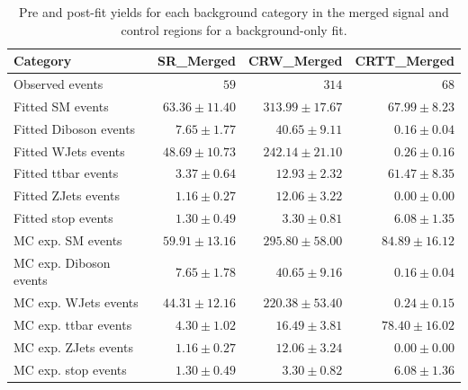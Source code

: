 \begin{table}[h]
\centering
\small
\begin{tabular*}{\textwidth}{@{\extracolsep{\fill}}lrrr}
\toprule
\textbf{Category}           & SR\_Merged            & CRW\_Merged            & CRTT\_Merged              \\
\midrule
Observed events          & $59$              & $314$              & $68$                    \\
\midrule
Fitted SM events         & $63.36 \pm 11.40$          & $313.99 \pm 17.67$          & $67.99 \pm 8.23$              \\
\midrule
        Fitted Diboson events         & $7.65 \pm 1.77$          & $40.65 \pm 9.11$          & $0.16 \pm 0.04$              \\
        Fitted WJets events         & $48.69 \pm 10.73$          & $242.14 \pm 21.10$          & $0.26 \pm 0.16$              \\
        Fitted ttbar events         & $3.37 \pm 0.64$          & $12.93 \pm 2.32$          & $61.47 \pm 8.35$              \\
        Fitted ZJets events         & $1.16 \pm 0.27$          & $12.06 \pm 3.22$          & $0.00 \pm 0.00$              \\
        Fitted stop events         & $1.30 \pm 0.49$          & $3.30 \pm 0.81$          & $6.08 \pm 1.35$              \\
 \midrule
MC exp. SM events              & $59.91 \pm 13.16$          & $295.80 \pm 58.00$          & $84.89 \pm 16.12$              \\
\midrule
        MC exp. Diboson events         & $7.65 \pm 1.78$          & $40.65 \pm 9.16$          & $0.16 \pm 0.04$              \\
        MC exp. WJets events         & $44.31 \pm 12.16$          & $220.38 \pm 53.40$          & $0.24 \pm 0.15$              \\
        MC exp. ttbar events         & $4.30 \pm 1.02$          & $16.49 \pm 3.81$          & $78.40 \pm 16.02$              \\
        MC exp. ZJets events         & $1.16 \pm 0.27$          & $12.06 \pm 3.24$          & $0.00 \pm 0.00$              \\
        MC exp. stop events         & $1.30 \pm 0.49$          & $3.30 \pm 0.82$          & $6.08 \pm 1.36$              \\
\bottomrule
\end{tabular*}
\caption{Pre and post-fit yields for each background category in the merged signal and control regions for a background-only fit.}
\label{tab:yields_mgd}
\end{table}

